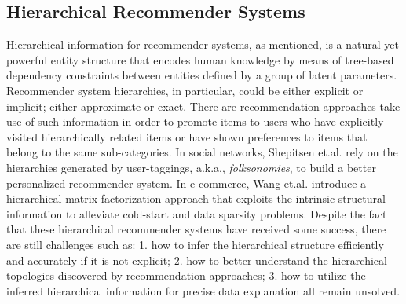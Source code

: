 \subsection{Hierarchical Recommender Systems}
Hierarchical information for recommender systems, as mentioned, is a natural yet powerful entity structure that encodes human knowledge by means of tree-based dependency constraints between entities defined by a group of latent parameters. %
Recommender system hierarchies, in particular, could be either explicit or implicit; either approximate or exact.  There are recommendation approaches take use of such information in order to promote items to users who have explicitly visited hierarchically related items or have shown preferences to items that belong to the same sub-categories.  In social networks, Shepitsen et.al. \cite{shepitsen2008personalized} rely on the hierarchies generated by user-taggings, a.k.a., \emph{folksonomies}, to build a better personalized recommender system.  In e-commerce, Wang et.al. \cite{wang2018exploring} introduce a hierarchical matrix factorization approach that exploits the intrinsic structural information to alleviate cold-start and data sparsity problems.  Despite the fact that these hierarchical recommender systems have received some success, there are still challenges such as: 1. how to infer the hierarchical structure efficiently and accurately if it is not explicit; 2. how to better understand the hierarchical topologies discovered by recommendation approaches; 3. how to utilize the inferred hierarchical information for precise data explanation all remain unsolved.

